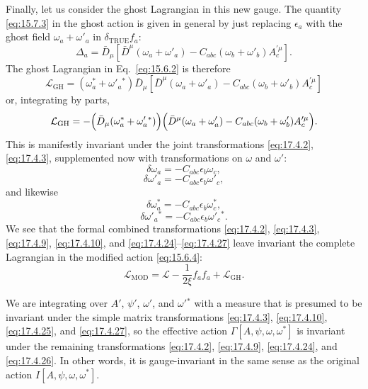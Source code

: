 Finally, let us consider the ghost Lagrangian in this new gauge. The quantity
\eqref{eq:15.7.3} in the ghost action is given in general by just replacing
$\epsilon_a$ with the ghost field $\omega_a+\omega'_a$ in
$\delta_{\mathrm{TRUE}}f_a$:
\begin{equation}
\Delta_a=\bar D_\mu\left[
\bar D^\mu(\omega_a+\omega'_a)
-C_{abc}(\omega_b+\omega'_b)
A_c^{\prime\mu}\right].
\label{eq:17.4.21}
\end{equation}
The ghost Lagrangian in Eq.~\eqref{eq:15.6.2} is therefore
\begin{equation}
\mathcal L_{\mathrm{GH}}
=(\omega_a^*+\omega'_a{}^*)\bar D_\mu\left[
\bar D^\mu(\omega_a+\omega'_a)
-C_{abc}(\omega_b+\omega'_b)
A_c^{\prime\mu}\right]
\label{eq:17.4.22}
\end{equation}
or, integrating by parts,
\begin{equation}
\mathcal L_{\mathrm{GH}}
=-\Bigl(\bar D_\mu(\omega_a^*+\omega'_a{}^*)\Bigr)
\Bigl(\bar D^\mu(\omega_a+\omega'_a)
-C_{abc}(\omega_b+\omega'_b)
A_c^{\prime\mu}\Bigr).
\label{eq:17.4.23}
\end{equation}
This is manifestly invariant under the joint transformations
\eqref{eq:17.4.2}, \eqref{eq:17.4.3}, supplemented now with
transformations on $\omega$ and $\omega'$:
\begin{equation}
\delta\omega_a
=-C_{abc}\epsilon_b\omega_c,
\label{eq:17.4.24}
\end{equation}
\begin{equation}
\delta\omega'_a
=-C_{abc}\epsilon_b\omega'_c,
\label{eq:17.4.25}
\end{equation}
and likewise
\begin{equation}
\delta\omega_a^*
=-C_{abc}\epsilon_b\omega_c^*,
\label{eq:17.4.26}
\end{equation}
\begin{equation}
\delta\omega'_a{}^*
=-C_{abc}\epsilon_b\omega'_c{}^*.
\label{eq:17.4.27}
\end{equation}
We see that the formal combined transformations \eqref{eq:17.4.2},
\eqref{eq:17.4.3}, \eqref{eq:17.4.9}, \eqref{eq:17.4.10}, and
\eqref{eq:17.4.24}--\eqref{eq:17.4.27} leave invariant the complete
Lagrangian in the modified action \eqref{eq:15.6.4}:
\begin{equation}
\mathcal L_{\mathrm{MOD}}
=\mathcal L-\frac1{2\xi}f_a f_a+\mathcal L_{\mathrm{GH}}.
\label{eq:17.4.28}
\end{equation}

We are integrating over $A'$, $\psi'$, $\omega'$, and $\omega'{}^*$ with a
measure that is presumed to be invariant under the simple matrix
transformations \eqref{eq:17.4.3}, \eqref{eq:17.4.10},
\eqref{eq:17.4.25}, and \eqref{eq:17.4.27}, so the effective action
$\Gamma[A,\psi,\omega,\omega^*]$ is invariant under the remaining
transformations \eqref{eq:17.4.2}, \eqref{eq:17.4.9},
\eqref{eq:17.4.24}, and \eqref{eq:17.4.26}. In other words, it is
gauge-invariant in the same sense as the original action
$I[A,\psi,\omega,\omega^*]$.

